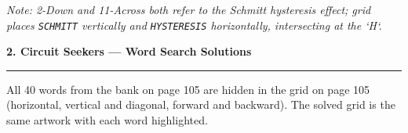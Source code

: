 \begin{tcolorbox}[
  colback=SoftBlue,
  colframe=IEEEblue!70!black,
  boxrule=0.5pt,
  arc=0mm,
  left=4mm, right=4mm, top=1.5mm, bottom=1.5mm
]
\smallskip
\footnotesize\itshape Note: 2-Down and 11-Across both refer to the Schmitt hysteresis effect; grid places \texttt{SCHMITT} vertically and \texttt{HYSTERESIS} horizontally, intersecting at the `H`.
\end{tcolorbox}

\vspace{0.25em}

\begin{tcolorbox}[
  colback=white,
  colframe=IEEEblue!70!black,
  boxrule=0.5pt,
  arc=0mm,
  left=4mm, right=4mm, top=1.5mm, bottom=1.5mm
]
{\large\bfseries\rmfamily\color{IEEEblue} 2. Circuit Seekers — Word Search Solutions\par}
\vspace{0.15em}
{\color{IEEEorange}\rule{\linewidth}{0.8pt}}\par
\smallskip
\footnotesize\rmfamily
\noindent All 40 words from the bank on page 105 are hidden in the grid on page 105 (horizontal, vertical and diagonal, forward and backward). The solved grid is the same artwork with each word highlighted.


\end{tcolorbox}
